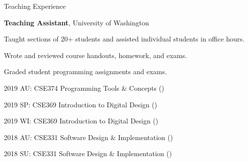 \begin{rubric}{Teaching Experience}

\entry*[2018 -- 2019]%
	\textbf{Teaching Assistant}, University of Washington
	\par Taught sections of 20+ students and assisted individual students in office hours.
	\par Wrote and reviewed course handouts, homework, and exams.
	\par Graded student programming assignments and exams.
	\par 2019 AU: CSE374 Programming Tools \& Concepts (\pPirtleT{})
	\par 2019 SP: CSE369 Introduction to Digital Design (\pHsiaJ{})
	\par 2019 WI: CSE369 Introduction to Digital Design (\pHsiaJ{})
	\par 2018 AU: CSE331 Software Design \& Implementation (\pErnstM{})
	\par 2018 SU: CSE331 Software Design \& Implementation (\pPerlmutterL{})
\end{rubric}